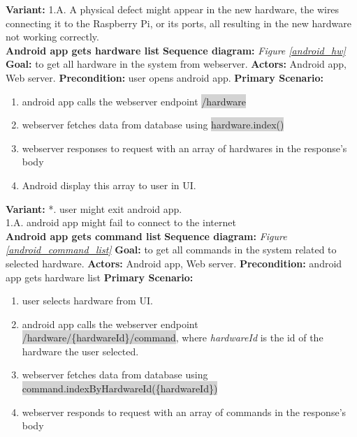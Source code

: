 \documentclass[12pt, oneside, a4paper]{book}
\newcommand{\code}[1]{{\color{red}\colorbox{lightgray}{#1}}}
\newcommand\boldcolor[1]{\textcolor{bold}{\textbf{#1}}}
\begin{document}
				\textbf{Variant:}\newline
				\hspace*{5mm}1.A. A physical defect might appear in the new hardware, the wires connecting it to the Raspberry Pi, or its ports, all resulting in the new hardware not working correctly. \\
				\newline\boldcolor{Android app gets hardware list}
				\newline\textbf{Sequence diagram:} \textit{Figure \ref{android_hw}}
				\newline\textbf{Goal:} to get all hardware in the system from webserver.
				\newline\textbf{Actors:} Android app, Web server.
				\newline\textbf{Precondition:} user opens android app.
				\newline\textbf{Primary Scenario:}	
				\begin{enumerate}[label*=\arabic*.]
					\item android app calls the webserver endpoint \code{/hardware}
					\item webserver fetches data from database using \code{hardware.index()}
					\item webserver responses to request with an array of hardwares in the response's body
					\item Android display this array to user in UI.
				\end{enumerate}
				\textbf{Variant:}\newline
				\hspace*{5mm}*. user might exit android app. \\
				\hspace*{5mm}1.A. android app might fail to connect to the internet \\
				\newline\boldcolor{Android app gets command list}
				\newline\textbf{Sequence diagram:} \textit{Figure \ref{android_command_list}}
				\newline\textbf{Goal:} to get all commands in the system related to selected hardware.
				\newline\textbf{Actors:} Android app, Web server.
				\newline\textbf{Precondition:} android app gets hardware list
				\newline\textbf{Primary Scenario:}	
				\begin{enumerate}[label*=\arabic*.]
					\item user selects hardware from UI.
					\item android app calls the webserver endpoint \code{/hardware/\{hardwareId\}/command}, where \textit{hardwareId} is the id of the hardware the user selected.
					\item webserver fetches data from database using \code{command.indexByHardwareId(\{hardwareId\})}
					\item webserver responds to request with an array of commands in the response's body
				\end{enumerate}
\end{document}
